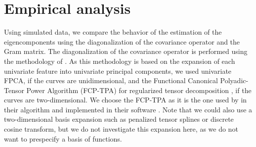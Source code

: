 \section{Empirical analysis} %
\label{sec:empirical_analysis}

Using simulated data, we compare the behavior of the estimation of the eigencomponents using the diagonalization of the covariance operator and the Gram matrix. The diagonalization of the covariance operator is performed using the methodology of \cite{happMultivariateFunctionalPrincipal2018a}. As this methodology is based on the expansion of each univariate feature into univariate principal components, we used univariate FPCA, if the curves are unidimensional, and the Functional Canonical Polyadic-Tensor Power Algorithm (FCP-TPA) for regularized tensor decomposition \citep{allenMultiwayFunctionalPrincipal2013a}, if the curves are two-dimensional. We choose the FCP-TPA as it is the one used by \cite{happMultivariateFunctionalPrincipal2018a} in their algorithm and implemented in their software \citep{happ-kurzObjectOrientedSoftwareFunctional2020}. Note that we could also use a two-dimensional basis expansion such as penalized tensor splines or discrete cosine transform, but we do not investigate this expansion here, as we do not want to prespecify a basis of functions.

